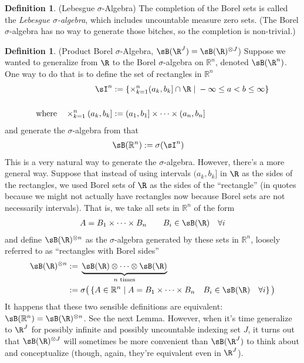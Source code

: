 \documentclass[12pt]{article}
\theoremstyle{plain}
\theoremstyle{definition}
\newtheorem{defn}[thm]{Definition}
\theoremstyle{remark}
\newcommand{\Rn}{\mathbb{R}^n}
\begin{document}
\begin{defn}(Lebesgue $\sigma$-Algebra)
The completion of the Borel sets is called the
\emph{Lebesgue $\sigma$-algebra}, which includes uncountable measure
zero sets. (The Borel $\sigma$-algebra has no way to generate those
bitches, so the completion is non-trivial.)
\end{defn}

\begin{defn}(Product Borel $\sigma$-Algebra,
$\sB(\R^J)=\sB(\R)^{\otimes J}$)
Suppose we wanted to generalize from $\R$ to the Borel $\sigma$-algebra
on $\Rn$, denoted $\sB(\R^n)$. One way to do that is to define the set
of rectangles in $\Rn$
\begin{align*}
  \sI^n &:=
  \left\{
    \times_{k=1}^n (a_{k},b_{k}] \cap \R
    \;|\; -\infty\leq a < b \leq \infty
  \right\} \\\\
  \text{where} \quad
  \times_{k=1}^n (a_{k},b_{k}]
  &:=
  (a_{1},b_{1}]
  \times \cdots\times
  (a_{n},b_{n}]
\end{align*}
and generate the $\sigma$-algebra from that
\begin{align*}
  \sB(\Rn) &:= \sigma(\sI^n)
\end{align*}
This is a very natural way to generate the $\sigma$-algebra. However,
there's a more general way. Suppose that instead of using intervals
$(a_k,b_k]$ in $\R$ as the sides of the rectangles, we used Borel sets
of $\R$ as the sides of the ``rectangle'' (in quotes because we might
not actually have rectangles now because Borel sets are not necessarily
intervals).
That is, we take all sets in $\Rn$ of the form
\begin{align*}
  A = B_1 \times \cdots \times B_n
  \qquad B_i \in \sB(\R) \quad\forall i
\end{align*}
and define $\sB(\R)^{\otimes n}$ as the $\sigma$-algebra generated by
these sets in $\Rn$, loosely referred to as ``rectangles with Borel
sides''
\begin{align*}
  \sB(\R)^{\otimes n}
  :=&\; \underbrace{\sB(\R) \otimes \cdots \otimes \sB(\R)}_{\text{$n$ times}} \\
  :=&\;
  \sigma
  \big(
  \left\{
  A \in \Rn \;|\;
  A = B_1 \times \cdots \times B_n
  \quad B_i \in \sB(\R) \quad\forall i
  \right\}
  \big)
\end{align*}
It happens that these two sensible definitions are equivalent:
$\sB(\Rn)=\sB(\R)^{\otimes n}$. See the next Lemma. However, when it's
time generalize to $\R^J$ for possibly infinite and possibly uncountable
indexing set $J$, it turns out that $\sB(\R)^{\otimes J}$ will
sometimes be more convenient than $\sB(\R^J)$ to think about and
conceptualize (though, again, they're equivalent even in $\R^J$).


\end{defn}
\end{document}
